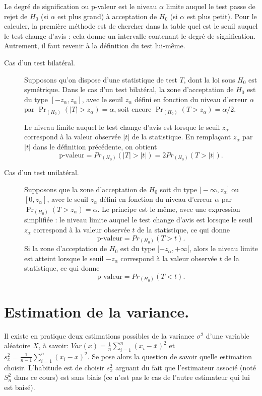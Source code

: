 \documentclass[12pt, a4paper]{book}
\numberwithin{equation}{section}
\begin{document}
Le degré de signification ou p-valeur est le niveau $\alpha$ limite auquel le test passe de rejet de $H_0$ (si $\alpha$ est plus grand) à acceptation de $H_0$ (si $\alpha$ est plus petit). 
Pour le calculer, la première méthode est de chercher dans la table quel est le seuil auquel le test change d'avis : cela donne un intervalle contenant le degré de signification. 
Autrement, il faut revenir à la définition du test lui-même.
\begin{description}
 \item[Cas d'un test bilatéral.] Supposons qu'on dispose d'une statistique de test $T$, dont la loi sous $H_0$ est symétrique. Dans le cas d'un test bilatéral, la zone d'acceptation de $H_0$ est du type $[-z_\alpha, z_\alpha]$, avec le seuil $z_\alpha$ défini en fonction du niveau d'erreur $\alpha$ par $\Pr_{(H_0)}(|T|>z_\alpha)=\alpha$, soit encore $\Pr_{(H_0)}(T>z_\alpha)=\alpha/2$.
 
 Le niveau limite auquel le test change d'avis est lorsque le seuil $z_\alpha$ correspond à la valeur observée $|t|$ de la statistique. En remplaçant $z_\alpha$ par $|t|$ dans le définition précédente, on obtient
 \[ \text{p-valeur} = Pr_{(H_0)}(|T|>|t|) = 2 Pr_{(H_0)}(T>|t|). \]
 \item[Cas d'un test unilatéral.] Supposons que la zone d'acceptation de $H_0$ soit du type $]-\infty, z_\alpha]$ ou $[0, z_\alpha]$, avec le seuil $z_\alpha$ défini en fonction du niveau d'erreur $\alpha$ par $\Pr_{(H_0)}(T>z_\alpha)=\alpha$. Le principe est le même, avec une expression simplifiée : le niveau limite auquel le test change d'avis est lorsque le seuil $z_\alpha$ correspond à la valeur observée $t$ de la statistique, ce qui donne
 \[ \text{p-valeur} = Pr_{(H_0)}(T>t). \]
 Si la zone d'acceptation de $H_0$ est du type $[-z_\alpha, +\infty[$, alors le niveau limite est atteint lorsque le seuil $-z_\alpha$ correspond à la valeur observée $t$ de la statistique, ce qui donne
 \[ \text{p-valeur} = Pr_{(H_0)}(T<t). \]
\end{description}

\section{Estimation de la variance.}

\medskip\noindent
Il existe en pratique deux estimations possibles de la variance $\sigma^2$ d'une variable aléatoire $X$, 
à savoir:
$Var(x) = {\frac 1n} \sum_{i=1}^n (x_i - \overline{x})^2$ et $s_x^2= \frac{1}{n-1} \sum_{i=1}^n  
(x_i - \overline{x})^2$. 
Se pose alors la question de savoir quelle estimation choisir. L'habitude est de choisir $s_x^2$ arguant du 
fait que l'estimateur associé  (noté $S_n^2$ dans ce cours) est sans biais (ce n'est pas le cas de 
l'autre estimateur qui lui est baisé).
\end{document}
